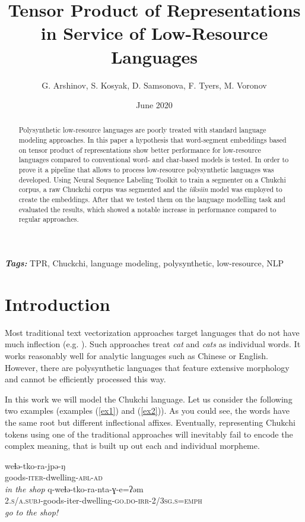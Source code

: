 \documentclass[leqno]{article}
\title{Tensor Product of Representations in Service of Low-Resource Languages}
\author{G. Arshinov, S. Kosyak, D. Samsonova, F. Tyers, M. Voronov}
\date{June 2020}
\providecommand{\keywords}[1]{\textbf{\textit{Tags: }} #1}
\begin{document}
\maketitle

\begin{abstract}
Polysynthetic low-resource languages are poorly treated with standard language modeling approaches. In this paper a hypothesis that word-segment embeddings based on tensor product of representations show better performance for low-resource languages compared to conventional word- and char-based models is tested. In order to prove it a pipeline that allows to process low-resource polysynthetic languages was developed. Using Neural Sequence Labeling Toolkit \parencite{yang2018ncrf} to train a segmenter on a Chukchi corpus, a raw Chuckchi corpus was segmented and the \textit{iiksiin} \parencite{iiksiin} model was employed to create the embeddings. After that we tested them on the language modelling task and evaluated the results, which showed a notable increase in performance compared to regular approaches.
\end{abstract}

\keywords{TPR, Chuckchi, language modeling, polysynthetic, low-resource, NLP} 

\section{Introduction}

Most traditional text vectorization approaches target languages that do not have much inflection
(e.g. \parencite{word2vec, bojanowski2017enriching, pennington2014glove}).
Such approaches treat \textit{cat} and \textit{cats} as individual words. It works reasonably well for analytic languages such as Chinese or English. However, there are polysynthetic languages that feature extensive
morphology and cannot be efficiently processed this way.

In this work we will model the Chukchi language. Let us consider the
following two examples
(examples (\ref{ex1}) and (\ref{ex2})). As you could see, the words
have the same root but different inflectional affixes.
Eventually, representing Chukchi tokens using one of the traditional approaches will inevitably fail to encode the complex meaning, that is built up out each and individual morpheme.

\begin{exe}
    \ex \label{ex1}
    \gll weɬə-tko-ra-jpə-ŋ \\
    goods-\textsc{iter}-dwelling-\textsc{abl}-\textsc{ad}\\
    \glt \textit{in the shop}
    \ex \label{ex2}
    \gll q-weɬə-tko-ra-nta-ɣ-e=ʔəm \\
    \textsc{2.s/a.subj}-goods-{iter}-dwelling-\textsc{go.do-irr-2/3sg.s=emph} \\
    \glt \textit{go to the shop!}
\end{exe}
\end{document}
